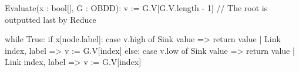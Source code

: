 \begin{blstlisting}
  Evaluate(x : bool[], G : OBDD):
    v := G.V[G.V.length - 1] // The root is outputted last by Reduce

    while True:
      if x[node.label]:
        case v.high of Sink{ value }        => return value
                     | Link{ index, label } => v := G.V[index]
      else:
        case v.low of Sink{ value }         => return value
                    | Link{ index, label }  => v := G.V[index]
\end{blstlisting}
